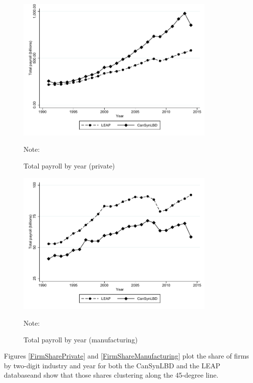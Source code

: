 \documentclass{article}
\begin{document}
\begin{figure} [H]
\centering
\caption{Total payroll by year (private)} \label{TotalPayrollPrivate}
\includegraphics[height=2.8in, width=.7\linewidth]{graphs/Total_payroll_by_year_private_bw.pdf} 
\begin{minipage}{0.85\textwidth}
{\footnotesize Note: \TableNote \par}
\end{minipage}
\end{figure}
\begin{figure} [H]
\centering
\caption{Total payroll by year (manufacturing)} \label{TotalPayrollManufacturing}
\includegraphics[height=2.8in, width=.7\linewidth]{graphs/Total_payroll_by_year_manufacturing_bw.pdf} 
\begin{minipage}{0.85\textwidth}
{\footnotesize Note: \TableNote \par}
\end{minipage}
\end{figure}

Figures \ref{FirmSharePrivate} and \ref{FirmShareManufacturing} plot the share of firms by two-digit industry and year for both the CanSynLBD and the LEAP databaseand show that those shares clustering along the 45-degree line.
\end{document}
